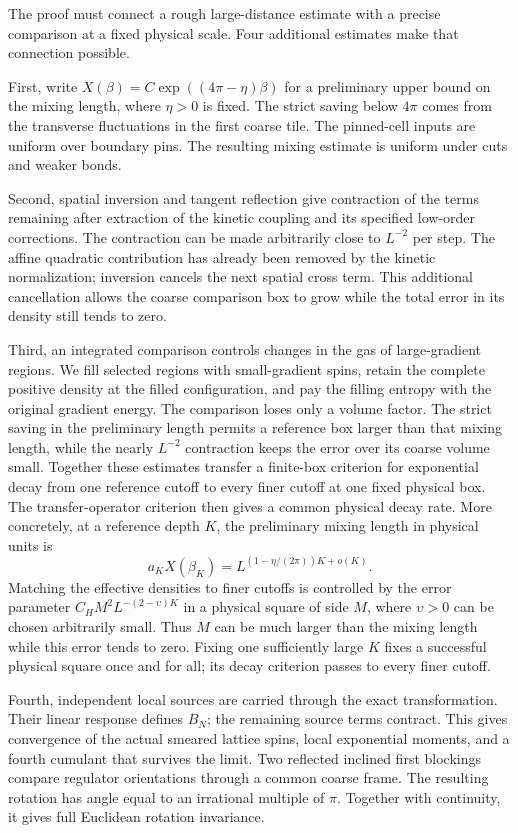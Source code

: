 The proof must connect a rough large-distance estimate with a precise
comparison at a fixed physical scale. Four additional estimates make that
connection possible.

First, write $X(\beta)=C\exp((4\pi-\eta)\beta)$ for a preliminary
upper bound on the mixing length, where $\eta>0$ is fixed.
The strict saving below $4\pi$ comes from the transverse fluctuations in
the first coarse tile. The pinned-cell inputs are uniform over boundary
pins. The resulting mixing estimate is uniform under cuts and weaker bonds.

Second, spatial inversion and tangent reflection give contraction of
the terms remaining after extraction of the kinetic coupling and its
specified low-order corrections. The contraction can be made arbitrarily
close to $L^{-2}$ per step. The
affine quadratic contribution has already been removed by the kinetic
normalization; inversion cancels the next spatial cross term. This
additional cancellation allows the coarse comparison box to grow while
the total error in its density still tends to zero.

Third, an integrated comparison controls changes in the gas of
large-gradient regions. We fill selected regions with small-gradient
spins, retain the complete positive density at the filled configuration,
and pay the filling entropy with the original gradient energy. The
comparison loses only a volume factor. The strict saving in the
preliminary length permits a reference box larger than that mixing length,
while the nearly $L^{-2}$ contraction keeps the error over its coarse
volume small. Together these estimates transfer a finite-box criterion
for exponential decay from one reference cutoff to every finer cutoff
at one fixed physical box. The transfer-operator criterion then gives a
common physical decay rate. More concretely, at a reference depth $K$,
the preliminary mixing length in physical units is
\[
 a_KX(\beta_K)=L^{(1-\eta/(2\pi))K+o(K)}.
\]
Matching the effective densities to finer cutoffs is controlled by the
error parameter $C_H M^2L^{-(2-\upsilon)K}$ in a physical square of side
$M$, where $\upsilon>0$ can be chosen arbitrarily small. Thus $M$ can be
much larger than the mixing length while this error tends to zero.
Fixing one sufficiently large $K$ fixes a successful physical square
once and for all; its decay criterion passes to every finer cutoff.

Fourth, independent local sources are carried through the exact
transformation. Their linear response defines $B_N$; the remaining source
terms contract. This gives convergence of the actual smeared lattice
spins, local exponential moments, and a fourth cumulant that survives the
limit. Two reflected inclined first blockings compare regulator
orientations through a common coarse frame. The resulting rotation has
angle equal to an irrational multiple of $\pi$. Together with continuity,
it gives full Euclidean rotation invariance.


